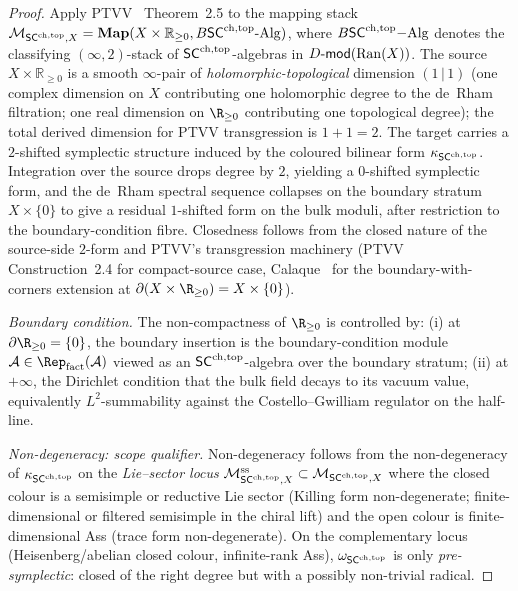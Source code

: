 \begin{proof}
Apply PTVV~\cite{PTVV13} Theorem~2.5 to the mapping stack
$\mathcal{M}_{\mathsf{SC}^{\mathrm{ch},\mathrm{top}},X}=\mathbf{Map}(X\times\mathbb{R}_{\geq 0},
B\mathsf{SC}^{\mathrm{ch},\mathrm{top}}{\text{-}}\mathrm{Alg})$, where
$B\mathsf{SC}^{\mathrm{ch},\mathrm{top}}\mathrm{-Alg}$ denotes the classifying $(\infty,2)$-stack of
$\mathsf{SC}^{\mathrm{ch},\mathrm{top}}$-algebras in $D\text{-}\mathsf{mod}(\mathrm{Ran}(X))$. The source
$X\times\mathbb{R}_{\geq 0}$ is a smooth $\infty$-pair of
\emph{holomorphic-topological} dimension $(1\,|\,1)$ (one complex
dimension on $X$ contributing one holomorphic degree to the de~Rham
filtration; one real dimension on $\R_{\geq 0}$ contributing one
topological degree); the total derived dimension for PTVV
transgression is $1+1=2$. The target carries a $2$-shifted
symplectic structure induced by the coloured bilinear form
$\kappa_{\mathsf{SC}^{\mathrm{ch},\mathrm{top}}}$. Integration over the source drops degree by
$2$, yielding a $0$-shifted symplectic form, and the de~Rham
spectral sequence collapses on the boundary stratum
$X\times\{0\}$ to give a residual $1$-shifted form on the bulk
moduli, after restriction to the boundary-condition fibre.
Closedness follows from the closed nature of the source-side
$2$-form and PTVV's transgression machinery (PTVV~\cite{PTVV13}
Construction~2.4 for compact-source case, Calaque~\cite{Calaque15}
for the boundary-with-corners extension at
$\partial(X\times\R_{\geq 0})=X\times\{0\}$).

\emph{Boundary condition.} The non-compactness of $\R_{\geq 0}$ is
controlled by:
(i) at $\partial\R_{\geq 0}=\{0\}$, the boundary insertion is
the boundary-condition module $\cA\in\Rep_{\mathrm{fact}}(\cA)$
viewed as an $\mathsf{SC}^{\mathrm{ch},\mathrm{top}}$-algebra over the boundary stratum;
(ii) at $+\infty$, the Dirichlet condition that the bulk field
decays to its vacuum value, equivalently $L^2$-summability against
the Costello--Gwilliam regulator on the half-line.

\emph{Non-degeneracy: scope qualifier.} Non-degeneracy
follows from the non-degeneracy of $\kappa_{\mathsf{SC}^{\mathrm{ch},\mathrm{top}}}$ on the
\emph{Lie--sector locus} $\mathcal{M}^{\mathrm{ss}}_{\mathsf{SC}^{\mathrm{ch},\mathrm{top}},X}\subset
\mathcal{M}_{\mathsf{SC}^{\mathrm{ch},\mathrm{top}},X}$ where the closed colour is a semisimple or
reductive Lie sector (Killing form non-degenerate; finite-dimensional
or filtered semisimple in the chiral lift) and the open colour is
finite-dimensional Ass (trace form non-degenerate). On the
complementary locus (Heisenberg/abelian closed colour, infinite-rank
Ass), $\omega_{\mathsf{SC}^{\mathrm{ch},\mathrm{top}}}$ is only \emph{pre-symplectic}: closed of
the right degree but with a possibly non-trivial radical.
\end{proof}

